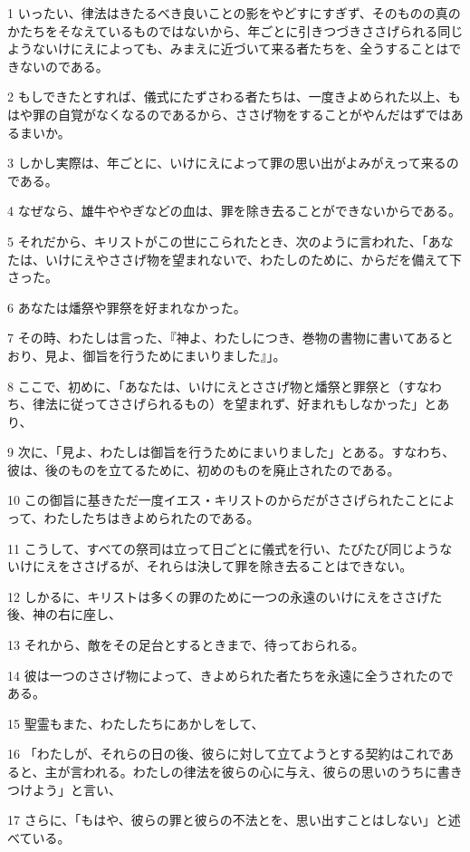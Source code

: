 \par 1 いったい、律法はきたるべき良いことの影をやどすにすぎず、そのものの真のかたちをそなえているものではないから、年ごとに引きつづきささげられる同じようないけにえによっても、みまえに近づいて来る者たちを、全うすることはできないのである。
\par 2 もしできたとすれば、儀式にたずさわる者たちは、一度きよめられた以上、もはや罪の自覚がなくなるのであるから、ささげ物をすることがやんだはずではあるまいか。
\par 3 しかし実際は、年ごとに、いけにえによって罪の思い出がよみがえって来るのである。
\par 4 なぜなら、雄牛ややぎなどの血は、罪を除き去ることができないからである。
\par 5 それだから、キリストがこの世にこられたとき、次のように言われた、「あなたは、いけにえやささげ物を望まれないで、わたしのために、からだを備えて下さった。
\par 6 あなたは燔祭や罪祭を好まれなかった。
\par 7 その時、わたしは言った、『神よ、わたしにつき、巻物の書物に書いてあるとおり、見よ、御旨を行うためにまいりました』」。
\par 8 ここで、初めに、「あなたは、いけにえとささげ物と燔祭と罪祭と（すなわち、律法に従ってささげられるもの）を望まれず、好まれもしなかった」とあり、
\par 9 次に、「見よ、わたしは御旨を行うためにまいりました」とある。すなわち、彼は、後のものを立てるために、初めのものを廃止されたのである。
\par 10 この御旨に基きただ一度イエス・キリストのからだがささげられたことによって、わたしたちはきよめられたのである。
\par 11 こうして、すべての祭司は立って日ごとに儀式を行い、たびたび同じようないけにえをささげるが、それらは決して罪を除き去ることはできない。
\par 12 しかるに、キリストは多くの罪のために一つの永遠のいけにえをささげた後、神の右に座し、
\par 13 それから、敵をその足台とするときまで、待っておられる。
\par 14 彼は一つのささげ物によって、きよめられた者たちを永遠に全うされたのである。
\par 15 聖霊もまた、わたしたちにあかしをして、
\par 16 「わたしが、それらの日の後、彼らに対して立てようとする契約はこれであると、主が言われる。わたしの律法を彼らの心に与え、彼らの思いのうちに書きつけよう」と言い、
\par 17 さらに、「もはや、彼らの罪と彼らの不法とを、思い出すことはしない」と述べている。
